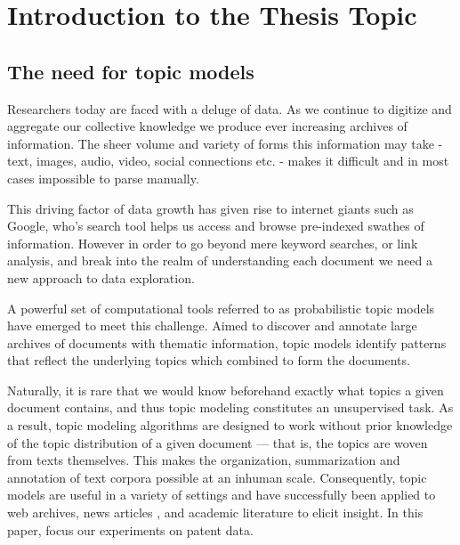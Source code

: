 
\chapter{Introduction to the Thesis Topic} %

\label{Chapter1} %


\newcommand{\keyword}[1]{\textbf{#1}}
\newcommand{\tabhead}[1]{\textbf{#1}}
\newcommand{\code}[1]{\texttt{#1}}
\newcommand{\file}[1]{\texttt{\bfseries#1}}
\newcommand{\option}[1]{\texttt{\itshape#1}}

\section{The need for topic models}
Researchers today are faced with a deluge of data. As we continue to digitize and aggregate our collective knowledge we produce ever increasing archives of information. The sheer volume and variety of forms this information may take - text, images, audio, video, social connections etc. - makes it difficult and in most cases impossible to parse manually. 

This driving factor of data growth has given rise to internet giants such as Google, who's search tool helps us access and browse pre-indexed swathes of information. However in order to go beyond mere keyword searches, or link analysis, and break into the realm of understanding each document we need a new approach to data exploration.

A powerful set of computational tools referred to as probabilistic topic models have emerged to meet this challenge. Aimed to discover and annotate large archives of documents with thematic information, topic models identify patterns that reflect the underlying topics which combined to form the documents.

Naturally, it is rare that we would know beforehand exactly what topics a given document contains, and thus topic modeling constitutes an unsupervised task. As a result, topic modeling algorithms are designed to work without prior knowledge of the topic distribution of a given document — that is, the topics are woven from texts themselves. This makes the organization, summarization and annotation of text corpora possible at an inhuman scale. Consequently, topic models are useful in a variety of settings and have successfully been applied to web archives, news articles \parencite{Newman:2006:AET:2106961.2106971}, and academic literature \parencite{Steyvers:2004:PAM:1014052.1014087} to elicit insight. In this paper, focus our experiments on patent data.


